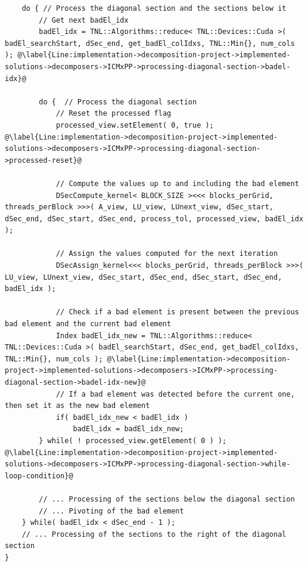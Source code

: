 \begin{lstlisting}
	do { // Process the diagonal section and the sections below it
		// Get next badEl_idx
		badEl_idx = TNL::Algorithms::reduce< TNL::Devices::Cuda >( badEl_searchStart, dSec_end, get_badEl_colIdxs, TNL::Min{}, num_cols ); @\label{Line:implementation->decomposition-project->implemented-solutions->decomposers->ICMxPP->processing-diagonal-section->badel-idx}@
		
		do {  // Process the diagonal section
			// Reset the processed flag
			processed_view.setElement( 0, true ); @\label{Line:implementation->decomposition-project->implemented-solutions->decomposers->ICMxPP->processing-diagonal-section->processed-reset}@
			
			// Compute the values up to and including the bad element
			DSecCompute_kernel< BLOCK_SIZE ><<< blocks_perGrid, threads_perBlock >>>( A_view, LU_view, LUnext_view, dSec_start, dSec_end, dSec_start, dSec_end, process_tol, processed_view, badEl_idx );
			
			// Assign the values computed for the next iteration
			DSecAssign_kernel<<< blocks_perGrid, threads_perBlock >>>( LU_view, LUnext_view, dSec_start, dSec_end, dSec_start, dSec_end, badEl_idx );
			
			// Check if a bad element is present between the previous bad element and the current bad element
			Index badEl_idx_new = TNL::Algorithms::reduce< TNL::Devices::Cuda >( badEl_searchStart, dSec_end, get_badEl_colIdxs, TNL::Min{}, num_cols ); @\label{Line:implementation->decomposition-project->implemented-solutions->decomposers->ICMxPP->processing-diagonal-section->badel-idx-new}@
			// If a bad element was detected before the current one, then set it as the new bad element
			if( badEl_idx_new < badEl_idx )
				badEl_idx = badEl_idx_new;
		} while( ! processed_view.getElement( 0 ) ); @\label{Line:implementation->decomposition-project->implemented-solutions->decomposers->ICMxPP->processing-diagonal-section->while-loop-condition}@
		
		// ... Processing of the sections below the diagonal section
		// ... Pivoting of the bad element
	} while( badEl_idx < dSec_end - 1 );
	// ... Processing of the sections to the right of the diagonal section
}
\end{lstlisting}

